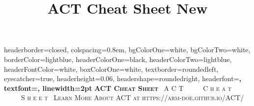\documentclass[potrait, z1paper, fontscale=0.33]{baposter} %
\title{ACT Cheat Sheet New}
\begin{document}
\begin{poster}
{
headerborder=closed, %
colspacing=0.8em, %
bgColorOne=white, %
bgColorTwo=white, %
borderColor=lightblue, %
headerColorOne=black, %
headerColorTwo=lightblue, %
headerFontColor=white, %
boxColorOne=white, %
textborder=roundedleft, %
eyecatcher=true, %
headerheight=0.06\textheight, %
headershape=roundedright, %
headerfont=\Large\bf\textsc, %
textfont={\setlength{\parindent}{1.5em}}, %
linewidth=2pt %
}
{\bf\textsc{ACT Cheat Sheet}\vspace{0.5em}} %
{\textsc{\ A C T \ \ \ \ \ C h e a t \ \ \ \ \ S h e e t\ \hspace{12pt}}}
{\textsc{Learn More About ACT at https://arm-doe.github.io/ACT/ \hspace{12pt}}}



\end{poster}
\end{document}
